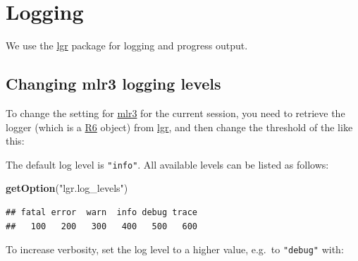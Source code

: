 \documentclass[]{scrbook}
\newenvironment{Shaded}{\begin{snugshade}}{\end{snugshade}}
\newcommand{\KeywordTok}[1]{\textcolor[rgb]{0.13,0.29,0.53}{\textbf{#1}}}
\newcommand{\NormalTok}[1]{#1}
\newcommand{\OperatorTok}[1]{\textcolor[rgb]{0.81,0.36,0.00}{\textbf{#1}}}
\newcommand{\StringTok}[1]{\textcolor[rgb]{0.31,0.60,0.02}{#1}}
\renewenvironment{Shaded} {\begin{snugshade}\small} {\end{snugshade}}
\begin{document}
\hypertarget{logging}{%
\section{Logging}\label{logging}}

We use the \href{https://cran.r-project.org/package=lgr}{lgr} package for logging and progress output.

\hypertarget{changing-mlr3-logging-levels}{%
\subsection{Changing mlr3 logging levels}\label{changing-mlr3-logging-levels}}

To change the setting for \href{https://mlr3.mlr-org.com}{mlr3} for the current session, you need to retrieve the logger (which is a \href{https://cran.r-project.org/package=R6}{R6} object) from \href{https://cran.r-project.org/package=lgr}{lgr}, and then change the threshold of the like this:

\begin{Shaded}
\end{Shaded}

The default log level is \texttt{"info"}.
All available levels can be listed as follows:

\begin{Shaded}
\begin{Highlighting}[]
\KeywordTok{getOption}\NormalTok{(}\StringTok{"lgr.log_levels"}\NormalTok{)}
\end{Highlighting}
\end{Shaded}

\begin{verbatim}
## fatal error  warn  info debug trace 
##   100   200   300   400   500   600
\end{verbatim}

To increase verbosity, set the log level to a higher value, e.g.~to \texttt{"debug"} with:

\begin{Shaded}
\end{Shaded}
\end{document}
